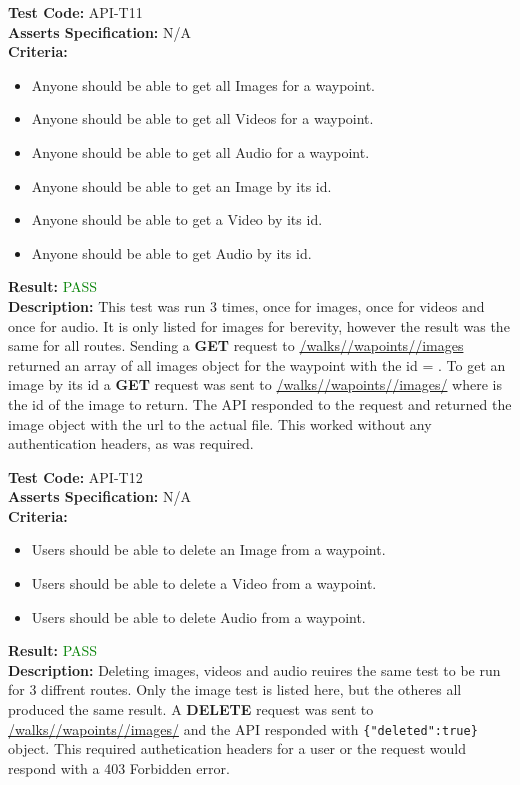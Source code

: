 \documentclass[11pt,a4paper]{report}
\begin{document}
\label{test:API-T11}
\noindent\textbf{Test Code:} API-T11\\
\textbf{Asserts Specification:} N/A \\ 
\textbf{Criteria:} \begin{itemize}
                     \item Anyone should be able to get all Images for a waypoint.
                     \item Anyone should be able to get all Videos for a waypoint.
                     \item Anyone should be able to get all Audio for a waypoint.
                     \item Anyone should be able to get an Image by its id.
                     \item Anyone should be able to get a Video by its id.
                     \item Anyone should be able to get Audio by its id.
                   \end{itemize}  
\textbf{Result:} \textcolor{green}{PASS}\\ 
\textbf{Description:} This test was run 3 times, once for images, once for videos and once for audio. It is only listed for images for berevity, however the result was the same for all routes. Sending a \textbf{GET} request to \url{/walks/}\url{/wapoints/}\url{/images} returned an array of all images object for the waypoint with the id = .
To get an image by its id a \textbf{GET} request was sent to \url{/walks/}\url{/wapoints/}\url{/images/} where  is the id of the image to return. The API responded to the request and returned the image object with the url to the actual file. This worked without any authentication headers, as was required.

\label{test:API-T12}
\noindent\textbf{Test Code:} API-T12\\
\textbf{Asserts Specification:} N/A \\ 
\textbf{Criteria:} \begin{itemize}
                     \item Users should be able to delete an Image from a waypoint.
                     \item Users should be able to delete a Video from a waypoint.
                     \item Users should be able to delete Audio from a waypoint.
                   \end{itemize}  
\textbf{Result:} \textcolor{green}{PASS}\\ 
\textbf{Description:} Deleting images, videos and audio reuires the same test to be run for 3 diffrent routes. Only the image test is listed here, but the otheres all produced the same result. A \textbf{DELETE} request was sent to \url{/walks/}\url{/wapoints/}\url{/images/} and the API responded with \lstinline${"deleted":true}$ object. This required authetication headers for a user or the request would respond with a 403 Forbidden error. 
\end{document}
